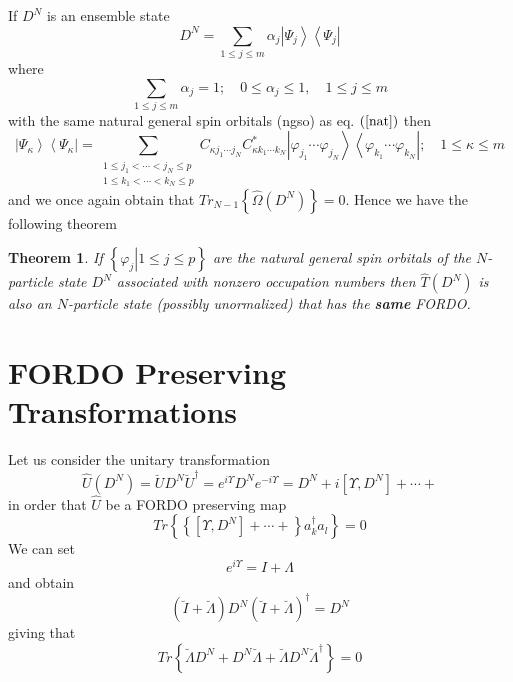 \documentclass[aps,preprint]{revtex4}%
\newtheorem{theorem}{Theorem}
\begin{document}
If $D^{N}$ is an ensemble state
\begin{equation}
D^{N}=\sum_{1\leq j\leq m}\alpha_{j}\left\vert \Psi_{j}\right\rangle
\left\langle \Psi_{j}\right\vert
\end{equation}
where
\begin{equation}
\sum_{1\leq j\leq m}\alpha_{j}=1;\quad0\leq\alpha_{j}\leq1,\quad1\leq j\leq m
\end{equation}
with the same natural general spin orbitals (ngso) as eq. $\left(
\ref{nat}\right)  $ then
\begin{equation}
\left\vert \Psi_{\kappa}\right\rangle \left\langle \Psi_{\kappa}\right\vert
=\sum_{\substack{1\leq j_{1}<\cdots<j_{N}\leq p\\1\leq k_{1}<\cdots<k_{N}\leq
p}}C_{\kappa j_{1}\cdots j_{N}}C_{\kappa k_{1}\cdots k_{N}}^{\ast}\left\vert
\varphi_{j_{1}}\cdots\varphi_{j_{N}}\right\rangle \left\langle \varphi_{k_{1}%
}\cdots\varphi_{k_{N}}\right\vert ;\quad1\leq\kappa\leq m
\end{equation}
and we once again obtain that $Tr_{N-1}\left\{  \hat{\Omega}\left(
D^{N}\right)  \right\}  =0$. Hence we have the following theorem

\begin{theorem}
If $\left\{  \left.  \varphi_{j}\right\vert 1\leq j\leq p\right\}  $ are the
natural general spin orbitals of the $N$-particle state $D^{N}$ associated
with nonzero occupation numbers then $\hat{T}\left(  D^{N}\right)  $ is also
an $N$-particle state (possibly unormalized) that has the \textbf{same }FORDO.
\end{theorem}

\section{FORDO Preserving Transformations}

Let us consider the unitary transformation
\begin{equation}
\hat{U}\left(  D^{N}\right)  =\breve{U}D^{N}\breve{U}^{\dagger}=e^{i\Upsilon
}D^{N}e^{-i\Upsilon}=D^{N}+i\left[  \Upsilon,D^{N}\right]  +\cdots+
\end{equation}
in order that $\hat{U}$ be a FORDO preserving map
\begin{equation}
Tr\left\{  \left\{  \left[  \Upsilon,D^{N}\right]  +\cdots+\right\}
a_{k}^{\dagger}a_{l}\right\}  =0
\end{equation}
We can set%
\begin{equation}
e^{i\Upsilon}=I+\Lambda
\end{equation}
and obtain
\begin{equation}
\left(  \breve{I}+\breve{\Lambda}\right)  D^{N}\left(  \breve{I}%
+\breve{\Lambda}\right)  ^{\dagger}=D^{N}%
\end{equation}
giving that
\begin{equation}
Tr\left\{  \breve{\Lambda}D^{N}+D^{N}\breve{\Lambda}+\breve{\Lambda}%
D^{N}\breve{\Lambda}^{\dagger}\right\}  =0
\end{equation}
\end{document}

